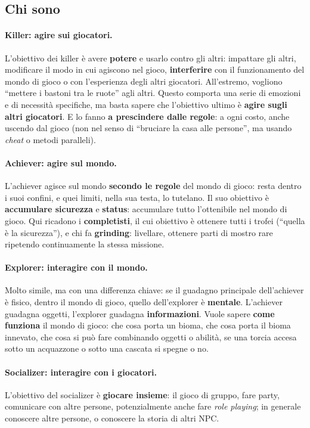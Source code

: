 \subsection{Chi sono}

\paragraph{Killer: agire sui giocatori.} L'obiettivo dei killer è avere
\textbf{potere} e usarlo contro gli altri: impattare gli altri, modificare il modo
in cui agiscono nel gioco, \textbf{interferire} con il funzionamento del mondo di
gioco o con l'esperienza degli altri giocatori. All'estremo, vogliono ``mettere i
bastoni tra le ruote'' agli altri. Questo comporta una serie di emozioni e di
necessità specifiche, ma basta sapere che l'obiettivo ultimo è \textbf{agire sugli
altri giocatori}. E lo fanno \textbf{a prescindere dalle regole}: a ogni costo,
anche uscendo dal gioco (non nel senso di ``bruciare la casa alle persone'', ma
usando \emph{cheat} o metodi paralleli).

\paragraph{Achiever: agire sul mondo.} L'achiever agisce sul mondo
\textbf{secondo le regole} del mondo di gioco: resta dentro i suoi confini, e quei
limiti, nella sua testa, lo tutelano. Il suo obiettivo è \textbf{accumulare
sicurezza} e \textbf{status}: accumulare tutto l'ottenibile nel mondo di gioco. Qui
ricadono i \textbf{completisti}, il cui obiettivo è ottenere tutti i trofei (``quella
è la sicurezza''), e chi fa \textbf{grinding}: livellare, ottenere parti di mostro
rare ripetendo continuamente la stessa missione.

\paragraph{Explorer: interagire con il mondo.} Molto simile, ma con una differenza
chiave: se il guadagno principale dell'achiever è fisico, dentro il mondo di gioco,
quello dell'explorer è \textbf{mentale}. L'achiever guadagna oggetti, l'explorer
guadagna \textbf{informazioni}. Vuole sapere \textbf{come funziona} il mondo di
gioco: che cosa porta un bioma, che cosa porta il bioma innevato, che cosa si può
fare combinando oggetti o abilità, se una torcia accesa sotto un acquazzone o sotto
una cascata si spegne o no.

\paragraph{Socializer: interagire con i giocatori.} L'obiettivo del socializer è
\textbf{giocare insieme}: il gioco di gruppo, fare party, comunicare con altre
persone, potenzialmente anche fare \emph{role playing}; in generale conoscere altre
persone, o conoscere la storia di altri NPC.

